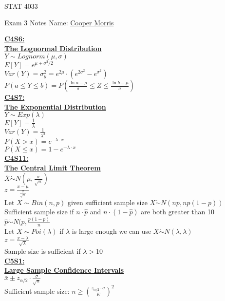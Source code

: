 \documentclass[letter, 12pt]{article}
\begin{document}
\begin{center}
STAT 4033
\end{center}
Exam 3 Notes \hfill Name: \uline{Cooper Morris}
\begin{multicols}{2}
\textbf{\uline{C4S6:}}\\
\textbf{\uline{The Lognormal Distribution}}\\
\(Y \sim Lognorm(\mu, \sigma)\)\\
\(E[Y] = e^{\mu+\sigma^2/2}\)\\
\(Var(Y) = \sigma_y^2 = e^{2\mu} \cdot (e^{2\sigma^2} - e^{\sigma^2})\)\\
\(P(a\leq Y \leq b) = P(\frac{\ln a -\mu}{\sigma} \leq Z \leq \frac{\ln b -\mu}{\sigma})\)\\
\textbf{\uline{C4S7:}}\\
\textbf{\uline{The Exponential Distribution}}\\
\(Y \sim Exp(\lambda)\)\\
\(E[Y] = \frac{1}{\lambda}\)\\
\(Var(Y) = \frac{1}{\lambda^2}\)\\
\(P(X>x) = e^{-\lambda\cdot x}\)\\
\(P(X\leq x) = 1-e^{-\lambda\cdot x}\)\\
\textbf{\uline{C4S11:}}\\
\textbf{\uline{The Central Limit Theorem}}\\
\(\bar{X} \dot{\sim} N(\mu, \frac{\sigma}{\sqrt{n}})\)\\
\(z = \frac{x-\mu}{\frac{\sigma}{\sqrt{n}}}\)\\
Let \(X\sim Bin(n,p)\) given sufficient sample size \(X\dot{\sim} N(np, np(1-p))\)\\
Sufficient sample size if \(n\cdot\hat{p}\) and \(n\cdot(1-\hat{p})\) are both greater than 10\\
\(\hat{p}\dot{\sim} N(p, \frac{p(1-p)}{n}\)\\
Let \(X \sim Poi(\lambda)\) if \(\lambda\) is large enough we can use \(X\dot{\sim} N(\lambda, \lambda)\)\\
\(z = \frac{x-\lambda}{\sqrt{\lambda}}\)\\
Sample size is sufficient if \(\lambda > 10\)\\
\textbf{\uline{C5S1:}}\\
\textbf{\uline{Large Sample Confidence Intervals}}\\
\(\bar{x} \pm z_{\alpha/2}\cdot\frac{\sigma}{\sqrt{n}}\)\\
Sufficient sample size: \(n \geq (\frac{z_{\alpha/2}\cdot\sigma}{E})^2\)\\

\end{multicols}
\end{document}
